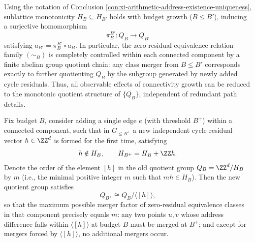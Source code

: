 \begin{conclusion}\label{con:xi-arithmetic-address-functorial-quotient-chain}
Using the notation of Conclusion \ref{con:xi-arithmetic-address-existence-uniqueness}, sublattice monotonicity \(H_B\subseteq H_{B'}\) holds with budget growth (\(B\le B'\)), inducing a surjective homomorphism
\[
\pi_{B}^{B'}:Q_B\to Q_{B'}
\]
satisfying \(a_{B'}=\pi_{B}^{B'}\circ a_B\).
In particular, the zero-residual equivalence relation family \((\sim_B)\) is completely controlled within each connected component by a finite abelian group quotient chain: any class merger from \(B\le B'\) corresponds exactly to further quotienting \(Q_B\) by the subgroup generated by newly added cycle residuals.
Thus, all observable effects of connectivity growth can be reduced to the monotonic quotient structure of \(\{Q_B\}\), independent of redundant path details.
\end{conclusion}

\begin{conclusion}\label{con:xi-single-cycle-merge-factor-order}
Fix budget \(B\), consider adding a single edge \(e\) (with threshold \(B^+\)) within a connected component, such that in \(G_{\le B^+}\) a new independent cycle residual vector \(h\in\ZZ^d\) is formed for the first time, satisfying
\[
h\notin H_B,
\qquad
H_{B^+}=H_B+\ZZ h.
\]
Denote the order of the element \([h]\) in the old quotient group \(Q_B=\ZZ^d/H_B\) by \(m\) (i.e., the minimal positive integer \(m\) such that \(mh\in H_B\)).
Then the new quotient group satisfies
\[
Q_{B^+}\cong Q_B/\langle [h]\rangle,
\]
so that the maximum possible merger factor of zero-residual equivalence classes in that component precisely equals \(m\):
any two points \(u,v\) whose address difference falls within \(\langle[h]\rangle\) at budget \(B\) must be merged at \(B^+\); and except for mergers forced by \(\langle[h]\rangle\), no additional mergers occur.
\end{conclusion}

